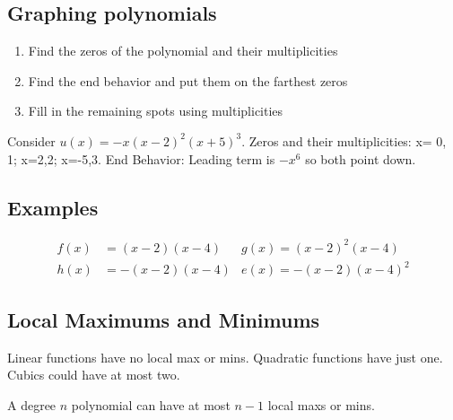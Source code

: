 \documentclass{tufte-handout}
\begin{document}
\subsection{Graphing polynomials}

\begin{enumerate}
\item Find the zeros of the polynomial and their multiplicities
\item Find the end behavior and put them on the farthest zeros
\item Fill in the remaining spots using multiplicities
\end{enumerate}

Consider $u(x) = -x(x-2)^2(x+5)^3$. Zeros and their multiplicities: x= 0, 1; x=2,2; x=-5,3. End Behavior: Leading term is $-x^6$ so both point down.

\subsection{Examples}

\begin{align*}
f(x) &= (x-2)(x-4) & g(x) = (x-2)^2(x-4) \\ 
h(x) &= -(x-2)(x-4) & e(x) = -(x-2)(x-4)^2
\end{align*}

\subsection{Local Maximums and Minimums}

Linear functions have no local max or mins.  Quadratic functions have just one.  Cubics could have at most two.

A degree $n$ polynomial can have at most $n-1$ local maxs or mins.
\end{document}
